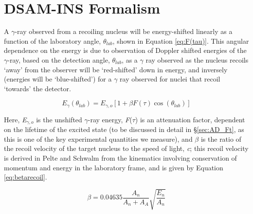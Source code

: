 \section{DSAM-INS Formalism}
A $\gamma$-ray observed from a recoiling nucleus will be energy-shifted linearly as a function of the laboratory angle, \textit{$\theta_{lab}$}, shown in Equation \ref{eq:F(tau)}. This angular dependence on the energy is due to observation of Doppler shifted energies of the $\gamma$-ray, based on the detection angle, $\theta_{lab}$, as a $\gamma$ ray observed as the nucleus recoils `away' from the observer will be `red-shifted' down in energy, and inversely (energies will be `blue-shifted') for a $\gamma$ ray observed for nuclei that recoil `towards' the detector.

\begin{equation} \label{eq:F(tau)}
E_{\gamma}(\theta_{lab})=E_{\gamma,o}[1+\beta F(\tau) \cos(\theta_{lab})]
\end{equation}

Here, \textit{E$_{\gamma,o}$} is the unshifted $\gamma$-ray energy, \textit{F}(\textit{$\tau$}) is an attenuation factor, dependent on the lifetime of the excited state (to be discussed in detail in \S \ref{sec:AD_Ft}, as this is one of the key experimental quantities we measure), and $\beta$ is the ratio of the recoil velocity of the target nucleus to the speed of light, \textit{c}; this recoil velocity is derived in Pelte and Schwalm \cite{Pelte_text} from the kinematics involving conservation of momentum and energy in the laboratory frame, and is given by Equation \ref{eq:betarecoil}. 

\begin{equation} \label{eq:betarecoil}
\beta=0.04635 \frac{A_n}{A_n+A_A}\sqrt{\frac{E_n}{A_n}}
\end{equation}

